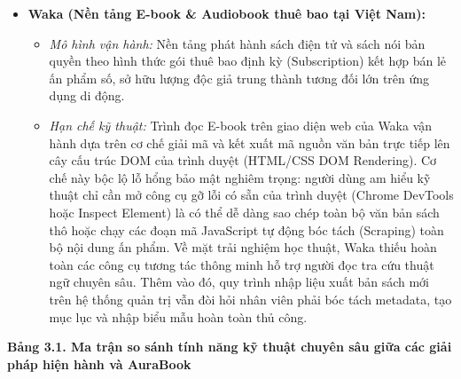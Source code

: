 \documentclass[11pt, a4paper]{report}
\begin{document}
\begin{itemize}
\begin{itemize}
    \end{itemize}
    \item \textbf{Waka (Nền tảng E-book \& Audiobook thuê bao tại Việt Nam):}
    \begin{itemize}
        \item \textit{Mô hình vận hành:} Nền tảng phát hành sách điện tử và sách nói bản quyền theo hình thức gói thuê bao định kỳ (Subscription) kết hợp bán lẻ ấn phẩm số, sở hữu lượng độc giả trung thành tương đối lớn trên ứng dụng di động.
        \item \textit{Hạn chế kỹ thuật:} Trình đọc E-book trên giao diện web của Waka vận hành dựa trên cơ chế giải mã và kết xuất mã nguồn văn bản trực tiếp lên cây cấu trúc DOM của trình duyệt (HTML/CSS DOM Rendering). Cơ chế này bộc lộ lỗ hổng bảo mật nghiêm trọng: người dùng am hiểu kỹ thuật chỉ cần mở công cụ gỡ lỗi có sẵn của trình duyệt (Chrome DevTools hoặc Inspect Element) là có thể dễ dàng sao chép toàn bộ văn bản sách thô hoặc chạy các đoạn mã JavaScript tự động bóc tách (Scraping) toàn bộ nội dung ấn phẩm. Về mặt trải nghiệm học thuật, Waka thiếu hoàn toàn các công cụ tương tác thông minh hỗ trợ người đọc tra cứu thuật ngữ chuyên sâu. Thêm vào đó, quy trình nhập liệu xuất bản sách mới trên hệ thống quản trị vẫn đòi hỏi nhân viên phải bóc tách metadata, tạo mục lục và nhập biểu mẫu hoàn toàn thủ công.
    \end{itemize}
\end{itemize}

\vspace{0.3cm}
\noindent\textbf{Bảng 3.1. Ma trận so sánh tính năng kỹ thuật chuyên sâu giữa các giải pháp hiện hành và AuraBook}
\end{document}
